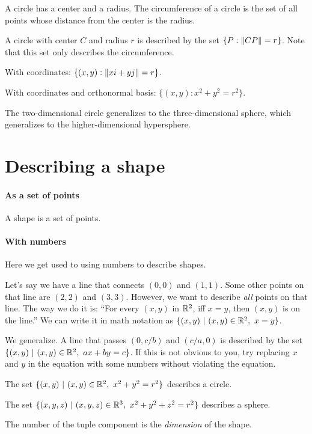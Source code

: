 A circle has a center and a radius.
The circumference of a circle is the set of all points
whose distance from the center is the radius.

A circle with center \(C\) and radius \(r\)
is described by the set \( \{ P : \norm{CP} = r \} \).
Note that this set only describes the circumference.

With coordinates: \( \{ (x,y) : \norm{xi + yj} = r \} \).

With coordinates and orthonormal basis: \( \{ (x,y) : x^2 + y^2 = r^2 \} \).

The two-dimensional circle generalizes to the three-dimensional sphere,
which generalizes to the higher-dimensional hypersphere.

\section*{Describing a shape}

\paragraph{As a set of points}

A shape is a set of points.

\paragraph{With numbers}

Here we get used to using numbers to describe shapes.

Let's say we have a line that connects \((0,0)\) and \((1,1)\).
Some other points on that line are \((2,2)\) and \((3,3)\).
However, we want to describe \emph{all} points on that line.
The way we do it is: ``For every \((x,y)\) in \(\mathbb{R}^2\), iff \(x=y\), then \((x,y)\) is on the line.''
We can write it in math notation as \( \{ (x,y) ~|~ (x,y) \in \mathbb{R}^2, ~ x = y\} \).

We generalize.
A line that passes \((0,c/b)\) and \((c/a,0)\)
is described by the set \(\{ (x,y) ~|~ (x,y) \in \mathbb{R}^2, ~ ax + by = c \}\).
If this is not obvious to you, try replacing \(x\) and \(y\) in the equation with some numbers
without violating the equation.

The set \(\{ (x,y) ~|~ (x,y) \in \mathbb{R}^2, ~ x^2 + y^2 = r^2 \}\) describes a circle.

The set \(\{ (x,y,z) ~|~ (x,y,z) \in \mathbb{R}^3, ~ x^2 + y^2 + z^2 = r^2 \}\) describes a sphere.

%
%
The number of the tuple component is the \emph{dimension} of the shape.

